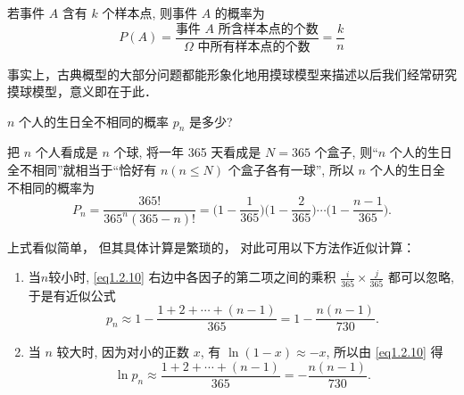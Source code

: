 \begin{definition}
    若事件 $A$ 含有 $k$ 个样本点, 则事件 $A$ 的概率为
    \[  P (A) = \frac{\text{事件 } A \text{ 所含样本点的个数}}{\Omega \text{ 中所有样本点的个数}} = \frac{k}{n} \]
\end{definition}

\begin{note}
    事实上，古典概型的大部分问题都能形象化地用摸球模型来描述以后我们经常研究摸球模型，意义即在于此．
\end{note}

\begin{example}[生日问题]
    $n$ 个人的生日全不相同的概率 $p_n$ 是多少?
\end{example}

\begin{solution}
    把 $n$ 个人看成是 $n$ 个球,
    将一年 365 天看成是 $N=365$ 个盒子,
    则“$n$ 个人的生日全不相同”就相当于“恰好有 $n (n \le N)$ 个盒子各有一球”,
    所以 $n$ 个人的生日全不相同的概率为
    \begin{equation}
        P_n = \frac{365!}{365^n (365 - n)!}
        = \biggl(1 - \frac{1}{365}\biggr) \biggl(1 - \frac{2}{365}\biggr)
        \dotsb \biggl(1 - \frac{n - 1}{365}\biggr).
        \label{eq1.2.10}
    \end{equation}

    上式看似简单，
    但其具体计算是繁琐的，
    对此可用以下方法作近似计算：

    \begin{enumerate}
        \item 当$n$较小时,
              \eqref{eq1.2.10} 右边中各因子的第二项之间的乘积 $\frac{i}{365} \times \frac{j}{365}$ 都可以忽略,
              于是有近似公式
              \begin{equation}
                  p_n \approx 1 - \frac{1 + 2 + \dotsb + (n - 1)}{365}
                  = 1 - \frac{n (n - 1)}{730}.
                  \label{eq1.2.11}
              \end{equation}

        \item 当 $n$ 较大时,
              因为对小的正数 $x$,
              有 $\ln (1-x) \approx -x$,
              所以由 \eqref{eq1.2.10} 得
              \begin{equation}
                  \ln p_n \approx \frac{1 + 2 + \dotsb + (n - 1)}{365}
                  = -\frac{n (n - 1)}{730}.
                  \label{eq1.2.12}
              \end{equation}
    \end{enumerate}


\end{solution}
